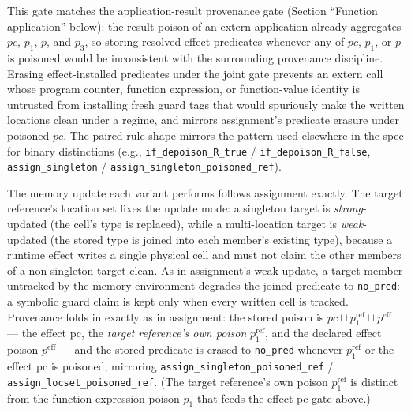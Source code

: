 \documentclass[12pt]{article}
\begin{document}
This gate matches the application-result provenance gate (Section
``Function application'' below): the result poison of an extern application
already aggregates \(\textit{pc}\), \(p_1\), \(p\), and \(p_3\), so storing
resolved effect predicates whenever any of \(\textit{pc}\), \(p_1\), or \(p\)
is poisoned would be inconsistent with the surrounding provenance discipline.
Erasing effect-installed predicates under the joint gate prevents an extern
call whose program counter, function expression, or function-value identity
is untrusted from installing fresh guard tags that would spuriously make the
written locations clean under a regime, and mirrors assignment's predicate
erasure under poisoned \(\textit{pc}\). The paired-rule shape mirrors the
pattern used elsewhere in the spec for binary distinctions (e.g.,
\texttt{if\_depoison\_R\_true} / \texttt{if\_depoison\_R\_false},
\texttt{assign\_singleton} /
\texttt{assign\_singleton\_poisoned\_ref}).

The memory update each variant performs follows assignment exactly. The
target reference's location set fixes the update mode: a singleton target is
\emph{strong}-updated (the cell's type is replaced), while a multi-location
target is \emph{weak}-updated (the stored type is joined into each member's
existing type), because a runtime effect writes a single physical cell and
must not claim the other members of a non-singleton target clean. As in
assignment's weak update, a target member untracked by the memory environment
degrades the joined predicate to \texttt{no\_pred}: a symbolic guard claim is
kept only when every written cell is tracked. Provenance
folds in exactly as in assignment: the stored poison is \(\textit{pc} \sqcup
p_1^{\text{ref}} \sqcup p^{\text{eff}}\) --- the effect pc, the \emph{target
reference's own poison} \(p_1^{\text{ref}}\), and the declared effect poison
\(p^{\text{eff}}\) --- and the stored predicate is erased to \texttt{no\_pred}
whenever \(p_1^{\text{ref}}\) or the effect pc is poisoned, mirroring
\texttt{assign\_singleton\_poisoned\_ref} /
\texttt{assign\_locset\_poisoned\_ref}. (The target reference's own poison
\(p_1^{\text{ref}}\) is distinct from the function-expression poison \(p_1\)
that feeds the effect-pc gate above.)
\end{document}
